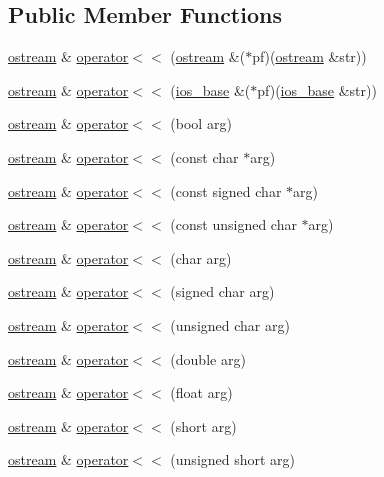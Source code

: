 \subsection*{Public Member Functions}
\begin{DoxyCompactItemize}
\item 
\hyperlink{classostream}{ostream} \& \hyperlink{classostream_a5266766c50e3a75df240fd170d8b0aa9}{operator$<$$<$} (\hyperlink{classostream}{ostream} \&($\ast$pf)(\hyperlink{classostream}{ostream} \&str))
\item 
\hyperlink{classostream}{ostream} \& \hyperlink{classostream_a0b8e3ee0ce7bf81a4aef821fd120ceaa}{operator$<$$<$} (\hyperlink{classios__base}{ios\-\_\-base} \&($\ast$pf)(\hyperlink{classios__base}{ios\-\_\-base} \&str))
\item 
\hyperlink{classostream}{ostream} \& \hyperlink{classostream_a622cb756a20bef228ac5d498af136844}{operator$<$$<$} (bool arg)
\item 
\hyperlink{classostream}{ostream} \& \hyperlink{classostream_a9a69eee80a56bc9ac6e8fe5c2c8eca4b}{operator$<$$<$} (const char $\ast$arg)
\item 
\hyperlink{classostream}{ostream} \& \hyperlink{classostream_a17e65ac739654f4c793c87fd5dd2c2df}{operator$<$$<$} (const signed char $\ast$arg)
\item 
\hyperlink{classostream}{ostream} \& \hyperlink{classostream_a9fb318a0d0c0f79e9339ac5260b29659}{operator$<$$<$} (const unsigned char $\ast$arg)
\item 
\hyperlink{classostream}{ostream} \& \hyperlink{classostream_a53f85ded39de2b9a04236e3e6e908bb5}{operator$<$$<$} (char arg)
\item 
\hyperlink{classostream}{ostream} \& \hyperlink{classostream_aa8e31685a18ce020e9bc349e812f2f2b}{operator$<$$<$} (signed char arg)
\item 
\hyperlink{classostream}{ostream} \& \hyperlink{classostream_aed85f1b4586c194179255a6d416620f7}{operator$<$$<$} (unsigned char arg)
\item 
\hyperlink{classostream}{ostream} \& \hyperlink{classostream_af17a91c13694fa2be823a5fd07ab34c6}{operator$<$$<$} (double arg)
\item 
\hyperlink{classostream}{ostream} \& \hyperlink{classostream_a9863b0b5ceae7d8ac89773308a4762a3}{operator$<$$<$} (float arg)
\item 
\hyperlink{classostream}{ostream} \& \hyperlink{classostream_a317be2eed651ead44e68a8380db2e3a0}{operator$<$$<$} (short arg)
\item 
\hyperlink{classostream}{ostream} \& \hyperlink{classostream_aa28738f89d7f2040dd8f585b90964557}{operator$<$$<$} (unsigned short arg)

\end{DoxyCompactItemize}
